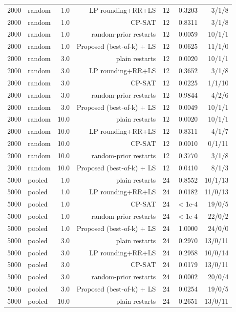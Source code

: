 \begin{table}[t]
\begin{tabular}{llrrrrr}
2000 & random & 1.0 & LP rounding+RR+LS & 12 & 0.3203 & 3/1/8 \\
2000 & random & 1.0 & CP-SAT & 12 & 0.8311 & 3/1/8 \\
2000 & random & 1.0 & random-prior restarts & 12 & 0.0059 & 10/1/1 \\
2000 & random & 1.0 & Proposed (best-of-k) + LS & 12 & 0.0625 & 11/1/0 \\
2000 & random & 3.0 & plain restarts & 12 & 0.0020 & 10/1/1 \\
2000 & random & 3.0 & LP rounding+RR+LS & 12 & 0.3652 & 3/1/8 \\
2000 & random & 3.0 & CP-SAT & 12 & 0.0225 & 1/1/10 \\
2000 & random & 3.0 & random-prior restarts & 12 & 0.9844 & 4/2/6 \\
2000 & random & 3.0 & Proposed (best-of-k) + LS & 12 & 0.0049 & 10/1/1 \\
2000 & random & 10.0 & plain restarts & 12 & 0.0020 & 10/1/1 \\
2000 & random & 10.0 & LP rounding+RR+LS & 12 & 0.8311 & 4/1/7 \\
2000 & random & 10.0 & CP-SAT & 12 & 0.0010 & 0/1/11 \\
2000 & random & 10.0 & random-prior restarts & 12 & 0.3770 & 3/1/8 \\
2000 & random & 10.0 & Proposed (best-of-k) + LS & 12 & 0.0410 & 8/1/3 \\
5000 & pooled & 1.0 & plain restarts & 24 & 0.8552 & 10/1/13 \\
5000 & pooled & 1.0 & LP rounding+RR+LS & 24 & 0.0182 & 11/0/13 \\
5000 & pooled & 1.0 & CP-SAT & 24 & $<$1e-4 & 19/0/5 \\
5000 & pooled & 1.0 & random-prior restarts & 24 & $<$1e-4 & 22/0/2 \\
5000 & pooled & 1.0 & Proposed (best-of-k) + LS & 24 & 1.0000 & 24/0/0 \\
5000 & pooled & 3.0 & plain restarts & 24 & 0.2970 & 13/0/11 \\
5000 & pooled & 3.0 & LP rounding+RR+LS & 24 & 0.2958 & 10/0/14 \\
5000 & pooled & 3.0 & CP-SAT & 24 & 0.0179 & 13/0/11 \\
5000 & pooled & 3.0 & random-prior restarts & 24 & 0.0002 & 20/0/4 \\
5000 & pooled & 3.0 & Proposed (best-of-k) + LS & 24 & 0.0254 & 19/0/5 \\
5000 & pooled & 10.0 & plain restarts & 24 & 0.2651 & 13/0/11 \\

\end{tabular}
\end{table}
